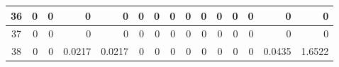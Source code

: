 \begin{table}[hb!]
\begin{adjustbox}{width = \textwidth, center}
\begin{tabular}{|c|r|r|r|r|r|r|r|r|r|r|r|r|r|r|}
        \rowcolor[HTML]{FFFFFF} 
        \cellcolor[HTML]{CFE2F3}36                                  & 0                                              & 0                                              & 0                                              & 0                                              & 0                                              & 0                                              & 0                                              & 0                                               & 0                                               & 0                                               & 0                                               & 0                                               & \cellcolor[HTML]{D9D2E9}0                                                       & \cellcolor[HTML]{D9D2E9}0                                                             \\ \hline
        \rowcolor[HTML]{FFFFFF} 
        \cellcolor[HTML]{CFE2F3}37                                  & 0                                              & 0                                              & 0                                              & 0                                              & 0                                              & 0                                              & 0                                              & 0                                               & 0                                               & 0                                               & 0                                               & 0                                               & \cellcolor[HTML]{D9D2E9}0                                                       & \cellcolor[HTML]{D9D2E9}0                                                             \\ \hline
        \rowcolor[HTML]{FFFFFF} 
        \cellcolor[HTML]{CFE2F3}38                                  & 0                                              & 0                                              & \cellcolor[HTML]{C7E9D8}0.0217                 & \cellcolor[HTML]{C7E9D8}0.0217                 & 0                                              & 0                                              & 0                                              & 0                                               & 0                                               & 0                                               & 0                                               & 0                                               & \cellcolor[HTML]{D9D2E9}0.0435                                                  & \cellcolor[HTML]{D9D2E9}1.6522                                                        \\ \hline

\end{tabular}
\end{adjustbox}
\end{table}
